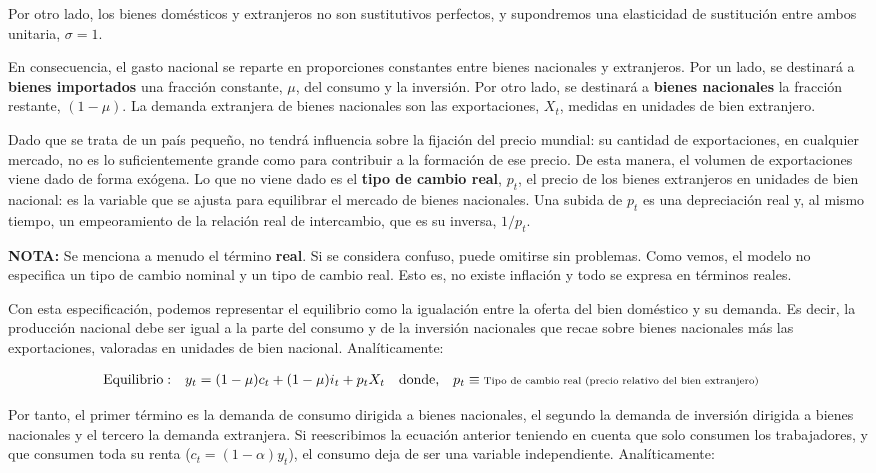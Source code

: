 \documentclass[10pt,a4paper]{article}
\begin{document}
Por otro lado, los bienes domésticos y extranjeros no son sustitutivos perfectos, y supondremos una elasticidad de sustitución entre ambos unitaria, $\sigma=1$.

En consecuencia, el gasto nacional se reparte en proporciones constantes entre bienes nacionales y extranjeros. Por un lado, se destinará a \textbf{bienes importados} una fracción constante, $\mu$, del consumo y la inversión. Por otro lado, se destinará a \textbf{bienes nacionales} la fracción restante, $(1-\mu)$. La demanda extranjera de bienes nacionales son las exportaciones, $X_t$, medidas en unidades de bien extranjero.

Dado que se trata de un país pequeño, no tendrá influencia sobre la fijación del precio mundial: su cantidad de exportaciones, en cualquier mercado, no es lo suficientemente grande como para contribuir a la formación de ese precio. De esta manera, el volumen de exportaciones viene dado de forma exógena. Lo que no viene dado es el \textbf{tipo de cambio real}, $p_t$, el precio de los bienes extranjeros en unidades de bien nacional: es la variable que se ajusta para equilibrar el mercado de bienes nacionales. Una subida de $p_t$ es una depreciación real y, al mismo tiempo, un empeoramiento de la relación real de intercambio, que es su inversa, $1/p_t$.

\textbf{NOTA:} Se menciona a menudo el término \textbf{real}. Si se considera confuso, puede omitirse sin problemas. Como vemos, el modelo no especifica un tipo de cambio nominal y un tipo de cambio real. Esto es, no existe inflación y todo se expresa en términos reales.

Con esta especificación, podemos representar el equilibrio como la igualación entre la oferta del bien doméstico y su demanda. Es decir, la producción nacional debe ser igual a la parte del consumo y de la inversión nacionales que recae sobre bienes nacionales más las exportaciones, valoradas en unidades de bien nacional. Analíticamente:

$$\begin{aligned}
    &\text{Equilibrio}:&& y_t=(1-\mu)c_t+(1-\mu)i_t+p_tX_t&& \text{donde,}\quad p_t\equiv\text{\scriptsize Tipo de cambio real (precio relativo del bien extranjero)}
\end{aligned}$$

Por tanto, el primer término es la demanda de consumo dirigida a bienes nacionales, el segundo la demanda de inversión dirigida a bienes nacionales y el tercero la demanda extranjera. Si reescribimos la ecuación anterior teniendo en cuenta que solo consumen los trabajadores, y que consumen toda su renta ($c_t=(1-\alpha)y_t$), el consumo deja de ser una variable independiente. Analíticamente:
\end{document}
